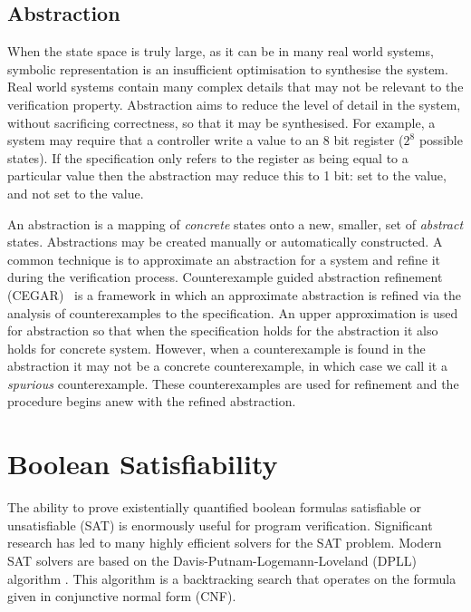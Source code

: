 \subsection{Abstraction}

When the state space is truly large, as it can be in many real world systems, symbolic representation is an insufficient optimisation to synthesise the system. Real world systems contain many complex details that may not be relevant to the verification property. Abstraction aims to reduce the level of detail in the system, without sacrificing correctness, so that it may be synthesised. For example, a system may require that a controller write a value to an 8 bit register ($2^8$ possible states). If the specification only refers to the register as being equal to a particular value then the abstraction may reduce this to 1 bit: set to the value, and not set to the value.

An abstraction is a mapping of \emph{concrete} states onto a new, smaller, set of  \emph{abstract} states. Abstractions may be created manually or automatically constructed. A common technique is to approximate an abstraction for a system and refine it during the verification process. Counterexample guided abstraction refinement (CEGAR)~\cite{Clarke00} is a framework in which an approximate abstraction is refined via the analysis of counterexamples to the specification. An upper approximation is used for abstraction so that when the specification holds for the abstraction it also holds for concrete system. However, when a counterexample is found in the abstraction it may not be a concrete counterexample, in which case we call it a \emph{spurious} counterexample. These counterexamples are used for refinement and the procedure begins anew with the refined abstraction.

\section{Boolean Satisfiability}

The ability to prove existentially quantified boolean formulas satisfiable or
unsatisfiable (SAT) is enormously useful for program verification. Significant
research has led to many highly efficient solvers for the SAT problem. Modern
SAT solvers are based on the Davis-Putnam-Logemann-Loveland (DPLL) algorithm
\cite{Davis60, Davis62}. This algorithm is a backtracking search that operates
on the formula given in conjunctive normal form (CNF).


